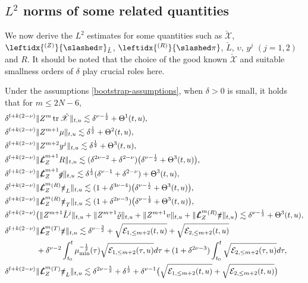 \documentclass[11pt,twoside]{article}
\def\de{\delta}
\def\f{\frac}
\def\les{\lesssim}
\def\Lc{\check{L}}
\def\Lies{\slashed{\mathcal{L}}}
\def\pis{\slashed{\pi}}
\begin{document}
\subsection{$L^2$ norms of some related quantities}
We now derive the $L^2$ estimates for some quantities such as
${\check{\mathscr X}}$, $\leftidx{^{(Z)}}{\slashed\pi}_{\mathring L}$, $\leftidx{^{(R)}}{\slashed\pi}$, $\check{L}$, $\upsilon$, $y^j$
$(j=1,2)$ and $R$. It should be noted that the choice of the good known $\check{\mathscr X}$ and suitable smallness orders of $\delta$
play crucial roles here.
\begin{proposition}\label{L2chi}
 Under the assumptions \eqref{bootstrap-assumptions}, when $\de>0$ is small, it holds that for $m\leq 2N-6$,
 \begin{equation}
 \begin{split}
 &\de^{l+k(2-\nu)}\|Z^{m}\operatorname{tr}\check{\mathscr X}\|_{t,u}\les\de^{\nu-\f12}+\Theta^1(t,u),\\
 &\de^{l+k(2-\nu)}\|Z^{m+1}\mu\|_{t,u}\les\de^{\f12}+\Theta^2(t,u),\\
 &\de^{l+k(2-\nu)}\|Z^{m+2} y^j\|_{t,u}\les\de^{\f12}+\Theta^3(t,u),\\
 &\de^{l+k(2-\nu)}\|\Lies_Z^{m+1}R\|_{t,u}\les(\delta^{2\nu-2}+\delta^{2-\nu})\big(\de^{\nu-\f12}+\Theta^3(t,u)\big),\\
 &\de^{l+k(2-\nu)}\|\Lies_Z^{m+1}\slashed g\|_{t,u}\les\de^{\f12}(\delta^{\nu-1}+\delta^{2-\nu})+\Theta^3(t,u),\\
 &\de^{l+k(2-\nu)}\|\Lies_Z^{m}{}^{(R)}\pis_L\|_{t,u}\les(1+\delta^{3\nu-4})\big(\delta^{\nu-\f12}+\Theta^3(t,u)\big),\\
 &\de^{l+k(2-\nu)}\|\Lies_Z^{m}{}^{(R)}\pis_T\|_{t,u}\les(1+\delta^{2\nu-3})\big(\delta^{\nu-\f12}+\Theta^3(t,u)\big),\\
 &\de^{l+k(2-\nu)}\big(\|Z^{m+1}\Lc^j\|_{t,u}+\|Z^{m+1}\check\varrho\|_{t,u}+\|Z^{m+1}v\|_{t,u}+\|\Lies_Z^{m}{}^{(R)}\pis\|_{t,u}\big)\les\de^{\nu-\f12}
+\Theta^3(t,u),\\
 &\de^{l+k(2-\nu)}\|\Lies_Z^{m}{}^{(T)}\pis\|_{t,u}\les\delta^{\nu-\f32}+\sqrt{\mathcal E_{1,\leq m+2}(t,u)}
+\sqrt{\mathcal E_{2,\leq m+2}(t,u)}\\
 &\qquad\qquad+\delta^{\nu-2}\int_{t_0}^t\mu_{\min}^{-\f12}(\tau)\sqrt{\mathcal E_{1,\leq m+2}(\tau,u)}d\tau+(1+\delta^{2\nu-3})\int_{t_0}^t\sqrt{\mathcal E_{2,\leq m+2}(\tau,u)}d\tau,\\
 &\de^{l+k(2-\nu)}\|\Lies_Z^{m}{}^{(T)}\pis_L\|_{t,u}\les\delta^{2\nu-\f52}+\delta^{\f12}+\delta^{\nu-1}\big(\sqrt{\mathcal E_{1,\leq m+2}(t,u)}+\sqrt{\mathcal E_{2,\leq m+2}(t,u)}\big)\\

\end{split}
\end{equation}
\end{proposition}
\end{document}
